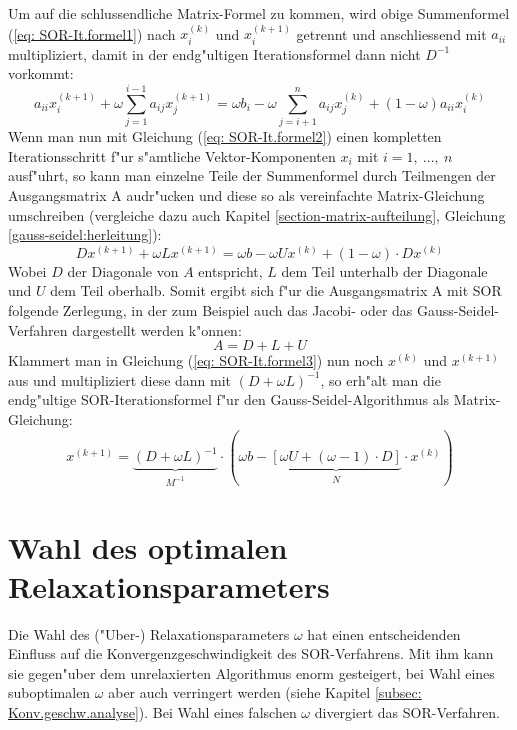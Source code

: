 \begin{refsection}
Um auf die schlussendliche Matrix-Formel zu kommen, wird obige
Summenformel (\ref{eq: SOR-It.formel1}) nach $x_i^{(k)}$ und $x_i^{(k+1)}$
getrennt und anschliessend mit $a_{ii}$ multipliziert, damit in der
endg"ultigen Iterationsformel dann nicht $D^{-1}$ vorkommt:
\begin{equation} \label{eq: SOR-It.formel2}
	a_{ii}x_i^{(k+1)} %
	+\omega %
	\sum\limits_{j=1}^{i-1} a_{ij}x_j^{(k+1)} %
 = \omega b_i- \omega %
 \sum\limits_{j=i+1}^n a_{ij}x_j^{(k)} %
 +(1-\omega)	%
	a_{ii}x_i^{(k)} %
\end{equation}
Wenn man nun mit Gleichung (\ref{eq: SOR-It.formel2}) einen kompletten
Iterationsschritt f"ur s"amtliche Vektor-Komponenten $x_i$ mit $i=1,\
...,\ n$ ausf"uhrt, so kann man einzelne Teile der Summenformel
durch Teilmengen der Ausgangsmatrix A audr"ucken und diese so als
vereinfachte Matrix-Gleichung umschreiben (vergleiche dazu auch Kapitel
\ref{section-matrix-aufteilung}, Gleichung \ref{gauss-seidel:herleitung}):
\begin{equation} \label{eq: SOR-It.formel3}
Dx^{(k+1)}+\omega Lx^{(k+1)}=\omega b-\omega Ux^{(k)}+(1-\omega)\cdot Dx^{(k)}
\end{equation}
Wobei $D$ der Diagonale von $A$ entspricht, $L$ dem Teil unterhalb
der Diagonale und $U$ dem Teil oberhalb. Somit ergibt sich f"ur die
Ausgangsmatrix A mit SOR folgende Zerlegung, in der zum Beispiel auch
das Jacobi- oder das Gauss-Seidel-Verfahren dargestellt werden k"onnen:
\begin{equation} \label{eq: SOR Matrix-Splitting}
A=D+L+U
\end{equation}
Klammert man in Gleichung (\ref{eq: SOR-It.formel3}) nun noch $x^{(k)}$
und $x^{(k+1)}$ aus und multipliziert diese dann mit $(D+\omega
L)^{-1}$, so erh"alt man die endg"ultige SOR-Iterationsformel f"ur den
Gauss-Seidel-Algorithmus als Matrix-Gleichung:
\begin{equation} \label{eq: SOR-It.formel}
x^{(k+1)}=\underbrace{(D+\omega L)^{-1}}_{\substack{M^{-1}}}\cdot(\omega b-\underbrace{[\omega U+(\omega-1)\cdot D]}_{\substack{N}}\cdot x^{(k)})
\end{equation}
		
\section{Wahl des optimalen Relaxationsparameters}
Die Wahl des ("Uber-) Relaxationsparameters $\omega$ hat einen
entscheidenden Einfluss auf die Konvergenzgeschwindigkeit des
SOR-Verfahrens. Mit ihm kann sie gegen"uber dem unrelaxierten Algorithmus
enorm gesteigert, bei Wahl eines suboptimalen $\omega$ aber auch
verringert werden (siehe Kapitel \ref{subsec: Konv.geschw.analyse}). Bei
Wahl eines falschen $\omega$ divergiert das SOR-Verfahren.


\end{refsection}
